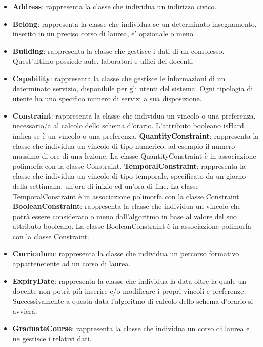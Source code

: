 \documentclass[11pt,a4paper]{article}
\begin{document}
\begin{itemize}
\item \textbf{Address}: rappresenta la classe che individua un indirizzo civico.

\item \textbf{Belong}: rappresenta la classe che individua se un determinato insegnamento, inserito in un preciso corso di laurea, e' opzionale o meno.

\item \textbf{Building}: rappresenta la classe che gestisce i dati di un complesso. Quest'ultimo possiede aule, laboratori e uffici dei docenti.

\item \textbf{Capability}: rappresenta la classe che gestisce le informazioni di un determinato servizio, disponibile per gli utenti del sistema. Ogni tipologia di utente ha uno specifico numero di servizi a sua disposizione.

\item \textbf{Constraint}: rappresenta la classe che individua un vincolo o una preferenza, necessario/a al calcolo dello schema d'orario. L'attributo booleano isHard indica se è un vincolo o una preferenza.
\subitem \textbf{QuantityConstraint}: rappresenta la classe che individua un vincolo di tipo numerico; ad esempio il numero massimo di ore di una lezione. La classe QuantityConstraint è in associazione polimorfa con la classe Constraint.
\subitem \textbf{TemporalConstraint}: rappresenta la classe che individua un vincolo di tipo temporale, specificato da un giorno della settimana, un'ora di inizio ed un'ora di fine. La classe TemporalConstraint è in associazione polimorfa con la classe Constraint.
\subitem \textbf{BooleanConstraint}: rappresenta la classe che individua un vincolo che potrà essere considerato o meno dall'algoritmo in base al valore del suo attributo booleano. La classe BooleanConstraint è in associazione polimorfa con la classe Constraint.

\item \textbf{Curriculum}: rappresenta la classe che individua un percorso formativo appartenetente ad un corso di laurea.

\item \textbf{ExpiryDate}: rappresenta la classe che individua la data oltre la quale un docente non potrà più inserire e/o modificare i propri vincoli e preferenze. Successivamente a questa data l'algoritmo di calcolo dello schema d'orario si avvierà. 

\item \textbf{GraduateCourse}: rappresenta la classe che individua un corso di laurea e ne gestisce i relativi dati.


\end{itemize}
\end{document}
